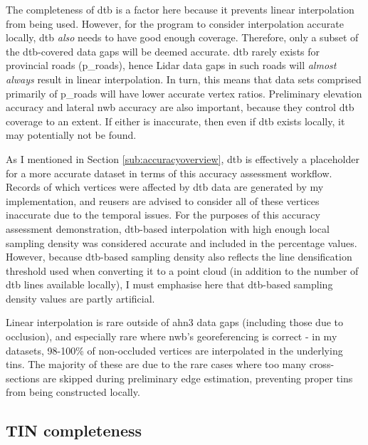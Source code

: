 The completeness of \ac{dtb} is a factor here because it prevents linear interpolation from being used. However, for the program to consider interpolation accurate locally, \ac{dtb} \textit{also} needs to have good enough coverage. Therefore, only a subset of the \ac{dtb}-covered data gaps will be deemed accurate. \ac{dtb} rarely exists for provincial roads (\ac{p_road}s), hence Lidar data gaps in such roads will \textit{almost always} result in linear interpolation. In turn, this means that data sets comprised primarily of \ac{p_road}s will have lower accurate vertex ratios. Preliminary elevation accuracy and lateral \ac{nwb} accuracy are also important, because they control \ac{dtb} coverage to an extent. If either is inaccurate, then even if \ac{dtb} exists locally, it may potentially not be found.

As I mentioned in Section \ref{sub:accuracyoverview}, \ac{dtb} is effectively a placeholder for a more accurate dataset in terms of this accuracy assessment workflow. Records of which vertices were affected by \ac{dtb} data are generated by my implementation, and reusers are advised to consider all of these vertices inaccurate due to the temporal issues. For the purposes of this accuracy assessment demonstration, \ac{dtb}-based interpolation with high enough local sampling density was considered accurate and included in the percentage values. However, because \ac{dtb}-based sampling density also reflects the line densification threshold used when converting it to a point cloud (in addition to the number of \ac{dtb} lines available locally), I must emphasise here that \ac{dtb}-based sampling density values are partly artificial.

Linear interpolation is rare outside of \ac{ahn3} data gaps (including those due to occlusion), and especially rare where \ac{nwb}'s georeferencing is correct - in my datasets, 98-100\% of non-occluded vertices are interpolated in the underlying \ac{tin}s. The majority of these are due to the rare cases where too many cross-sections are skipped during preliminary edge estimation, preventing proper \ac{tin}s from being constructed locally.

\subsection{TIN completeness}
\label{sub:tincompleteness}

